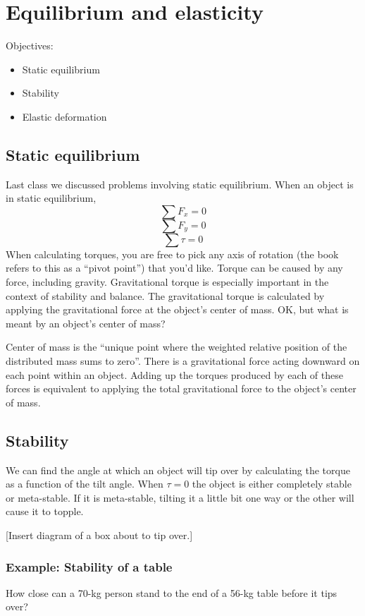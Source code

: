 \section{Equilibrium and elasticity}
Objectives:
\begin{itemize}
\item Static equilibrium
\item Stability
\item Elastic deformation
\end{itemize}

\hrulefill

\subsection{Static equilibrium}
Last class we discussed problems involving static equilibrium. When an object is in static equilibrium,
$$\sum F_x=0$$
$$\sum F_y=0$$
$$\sum \tau=0$$
When calculating torques, you are free to pick any axis of rotation (the book refers to this as a ``pivot point'') that you'd like. Torque can be caused by any force, including gravity. Gravitational torque is especially important in the context of stability and balance. The gravitational torque is calculated by applying the gravitational force at the object's center of mass. OK, but what is meant by an object's center of mass?

Center of mass is the ``unique point where the weighted relative position of the distributed mass sums to zero''. There is a gravitational force acting downward on each point within an object. Adding up the torques produced by each of these forces is equivalent to applying the total gravitational force to the object's center of mass.

\subsection{Stability}
We can find the angle at which an object will tip over by calculating the torque as a function of the tilt angle. When $\tau=0$ the object is either completely stable or meta-stable. If it is meta-stable, tilting it a little bit one way or the other will cause it to topple.

[Insert diagram of a box about to tip over.]
\vspace{5cm}

\subsubsection{Example: Stability of a table}
How close can a 70-kg person stand to the end of a 56-kg table before it tips over?

